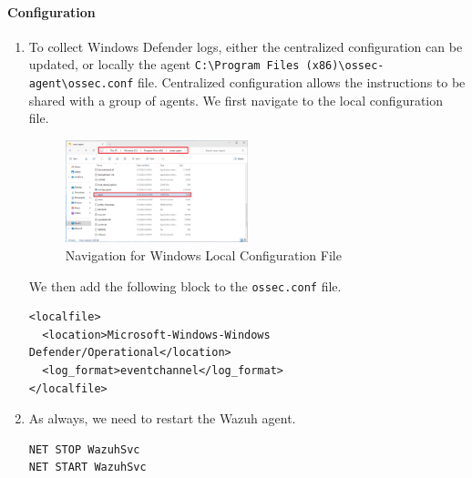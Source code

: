 \paragraph{Configuration}
\begin{enumerate}
    \item To collect Windows Defender logs, either the centralized configuration can be updated, or locally the agent \texttt{C:\textbackslash Program Files (x86)\textbackslash ossec-agent\textbackslash ossec.conf} file. Centralized configuration allows the instructions to be shared with a group of agents.
    We first navigate to the local configuration file.
    \begin{figure}[H]
        \centering
        \includegraphics[width=0.5\textwidth]{images/malware-detection/windows-log/1.png}
        \caption{Navigation for Windows Local Configuration File}
        \label{fig:win-conf-navigate}
    \end{figure}
    We then add the following block to the \texttt{ossec.conf} file.
    \begin{verbatim}
<localfile>
  <location>Microsoft-Windows-Windows Defender/Operational</location>
  <log_format>eventchannel</log_format>
</localfile>
    \end{verbatim}

    \item As always, we need to restart the Wazuh agent.
    \begin{verbatim}
NET STOP WazuhSvc
NET START WazuhSvc
    \end{verbatim}
\end{enumerate}

